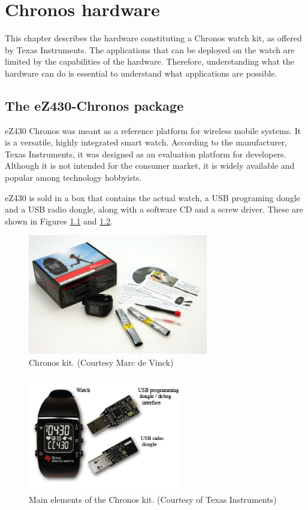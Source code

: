 \chapter{Chronos hardware}

This chapter describes the hardware constituting a Chronos watch kit,
as offered by Texas Instruments. The applications that can be deployed
on the watch are limited by the capabilities of the hardware.
Therefore, understanding what the hardware can do is essential to
understand what applications are possible.

\section{The eZ430-Chronos package}

eZ430 Chronos was meant as a reference platform for wireless mobile
systems.  It is a versatile, highly integrated smart watch.  According
to the manufacturer, Texas Instruments, it was designed  as an
evaluation platform for developers.  Although it is not intended for
the consumer market, it is widely available and popular among
technology hobbyists.

eZ430 is sold in a box that contains the actual watch, a USB programing dongle
and a USB radio dongle, along with a software CD and a screw driver.
These are shown in Figures \ref{fig:chronos_kit} and
\ref{fig:chronos_watch}.

\begin{figure}[h]
  \centering
  \includegraphics[width=0.7\textwidth]{img/chronos_kit.jpg}
  \caption{Chronos kit. (Courtesy Marc de
  Vinck)}
  \label{fig:chronos_kit}
\end{figure}

\begin{figure}[h]
  \centering
  \includegraphics[width=0.6\textwidth]{img/chronos_watch.png}
  \caption{Main elements of the Chronos kit. (Courtesy of Texas
  Instruments)}
  \label{fig:chronos_watch}
\end{figure}

